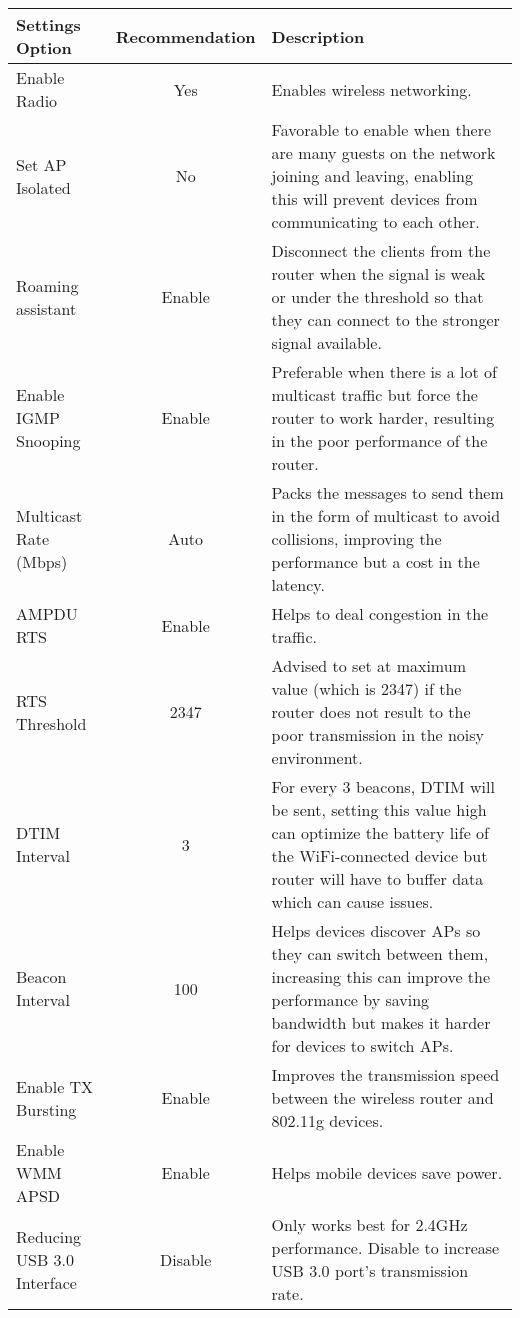 \begin{table}[ht]
    \centering
    \begin{tabular}{|p{3cm}|c|p{8cm}|}
    
    \hline
    \textbf{Settings Option}   & \textbf{Recommendation} & \textbf{Description}  \\
    \hline
     Enable Radio  & Yes & Enables wireless networking. \\
    \hline
    Set AP Isolated & No & Favorable to enable when there are many guests on the network joining and leaving, enabling this will prevent devices from communicating to each other. \\
    \hline
    Roaming assistant & Enable & Disconnect the clients from the router when the signal is weak or under the threshold so that they can connect to the stronger signal available. \\
    \hline
    Enable IGMP Snooping & Enable & Preferable when there is a lot of multicast traffic but force the router to work harder, resulting in the poor performance of the router.\\
    \hline 
    Multicast Rate (Mbps) & Auto & Packs the messages to send them in the form of multicast to avoid collisions, improving the performance but a cost in the latency.\\
    \hline
    AMPDU RTS & Enable & Helps to deal congestion in the traffic. \\
    \hline
    RTS Threshold & 2347 & Advised to set at maximum value (which is 2347) if the router does not result to the poor transmission in the noisy environment. \\
    \hline
    DTIM Interval & 3 & For every 3 beacons, DTIM will be sent, setting this value high can optimize the battery life of the WiFi-connected device but router will have to buffer data which can cause issues. \\
    \hline
    Beacon Interval & 100 & Helps devices discover APs so they can switch between them, increasing this can improve the performance by saving bandwidth but makes it harder for devices to switch APs. \\
    \hline
    Enable TX Bursting & Enable & Improves the transmission speed between the wireless router and 802.11g devices.\\
    \hline
    Enable WMM APSD & Enable & Helps mobile devices save power. \\
    \hline
    Reducing USB 3.0 Interface & Disable & Only works best for 2.4GHz performance. Disable to increase USB 3.0 port’s transmission rate. \\

\end{tabular}
\end{table}
